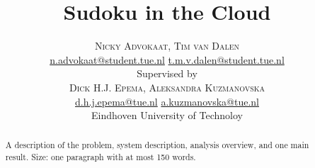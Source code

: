 \documentclass[twoside]{article}
\title{\vspace{-15mm}\fontsize{24pt}{10pt}\selectfont\textbf{Sudoku in the Cloud}} %
\author{
\large
\textsc{Nicky Advokaat, Tim van Dalen}\\[1mm] %
\normalsize \href{mailto:n.advokaat@student.tue.nl}{n.advokaat@student.tue.nl} \href{mailto:t.m.v.dalen@student.tue.nl}{t.m.v.dalen@student.tue.nl}\\[2mm] %
\normalsize Supervised by \\
\textsc{Dick H.J. Epema, Aleksandra Kuzmanovska}\\[1mm]
\normalsize \href{mailto:d.h.j.epema@tue.nl}{d.h.j.epema@tue.nl} \href{mailto:a.kuzmanovska@tue.nl}{a.kuzmanovska@tue.nl}\\[2mm] 
\normalsize Eindhoven University of Technoloy \\ %
\vspace{-5mm}
}
\date{}
\begin{document}
\maketitle %

\thispagestyle{fancy} %


\begin{abstract}

\noindent A description of the problem, system description, analysis overview, and one main result. Size: one paragraph with at most 150 words.

\end{abstract}

\end{document}
